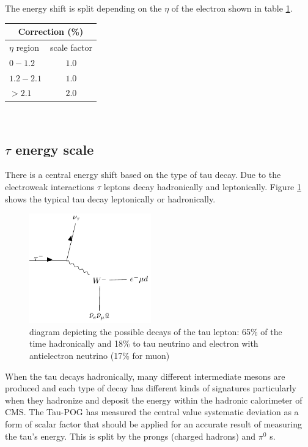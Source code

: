 The energy shift is split depending on the $\eta$ of the electron shown in table \ref{tab:EES}.\\
\begin{table}[h]
  \begin{center}
    \label{tab:EES}
    \begin{tabular} { l | c }
      \hline \multicolumn{2}{c}{Correction (\%)} \\
      \hline $\eta$ region & scale factor  \\ \hline
      $0 - 1.2$ & $1.0$ \\ 
      $1.2 - 2.1 $& $1.0 $\\ 
      $> 2.1$ & $2.0$ \\ 
    \end{tabular}
  \end{center}
\end{table}\\

\subsection{$\tau$ energy scale}
There is a central energy shift based on the type of tau decay. Due to the electroweak interactions $\tau$ leptons decay hadronically and leptonically. Figure \ref{fig:taudecay} shows the typical tau decay leptonically or hadronically.  \\

\begin{figure}[ht!b]
\begin{center}
  \includegraphics[width=0.47\textwidth]{"Figures/taudecay.pdf"}
    \caption{\label{fig:taudecay} diagram depicting the possible decays of the tau lepton: 65\% of the time hadronically and 18\% to tau neutrino and electron with antielectron neutrino (17\% for muon)}
\end{center}
\end{figure} 
When the tau decays hadronically, many different intermediate mesons are produced and each type of decay has different kinds of signatures particularly when they hadronize and deposit the energy within the hadronic calorimeter of CMS. The Tau-POG has measured the central value systematic deviation as a form of scalar factor that should be applied for an accurate result of measuring the tau's energy. This is split by the prongs (charged hadrons) and $\pi^0$ s.  


